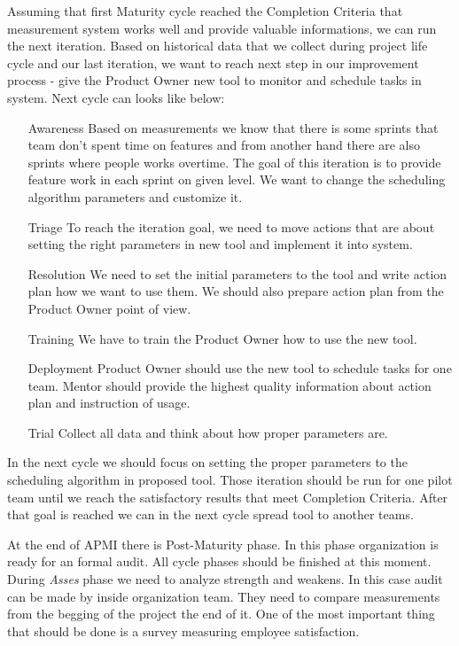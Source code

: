 Assuming that first Maturity cycle reached the Completion Criteria that measurement system works well and provide valuable informations, we can run the next iteration. Based on historical data that we collect during project life cycle and our last iteration, we want to reach next step in our improvement process - give the Product Owner new tool to monitor and schedule tasks in system. Next cycle can looks like below:

\begin{enumerate}
\item[Awareness] Based on measurements we know that there is some sprints that team don't spent time on features and from another hand there are also sprints where people works overtime. The goal of this iteration is to provide feature work in each sprint on given level. We want to change the scheduling algorithm parameters and customize it.
\item[Triage] To reach the iteration goal, we need to move actions that are about setting the right parameters in new tool and implement it into system.
\item[Resolution] We need to set the initial parameters to the tool and write action plan how we want to use them. We should also prepare action plan from the Product Owner point of view.
\item[Training] We have to train the Product Owner how to use the new tool. 
\item[Deployment] Product Owner should use the new tool to schedule tasks for one team. Mentor should provide the highest quality information about action plan and instruction of usage. 
\item[Trial] Collect all data and think about how proper parameters are.
\end{enumerate}
In the next cycle we should focus on setting the proper parameters to the scheduling algorithm in proposed tool. Those iteration should be run for one pilot team until we reach the satisfactory results that meet Completion Criteria. After that goal is reached we can in the next cycle spread tool to another teams. 

At the end of APMI there is Post-Maturity phase. In this phase organization is ready for an formal audit. All cycle phases should be finished at this moment. During \textit{Asses} phase we need to analyze strength and weakens. In this case audit can be made by inside organization team. They need to compare measurements from the begging of the project the end of it. One of the most important thing that should be done is a survey measuring employee satisfaction.

